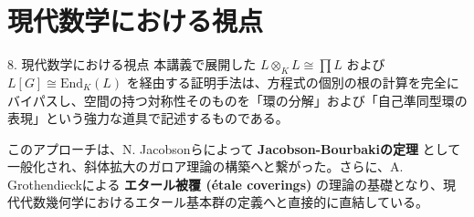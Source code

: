 \documentclass[11pt]{beamer}
\begin{document}
\section{現代数学における視点}
\begin{frame}[allowframebreaks]{8. 現代数学における視点}
    本講義で展開した $L \otimes_K L \cong \prod L$ および $L[G] \cong \mathrm{End}_K(L)$ を経由する証明手法は、方程式の個別の根の計算を完全にバイパスし、空間の持つ対称性そのものを「環の分解」および「自己準同型環の表現」という強力な道具で記述するものである。

    このアプローチは、N. Jacobsonらによって \textbf{Jacobson-Bourbakiの定理} として一般化され、斜体拡大のガロア理論の構築へと繋がった。さらに、A. Grothendieckによる \textbf{エタール被覆 (étale coverings)} の理論の基礎となり、現代代数幾何学におけるエタール基本群の定義へと直接的に直結している。
\end{frame}
\end{document}
